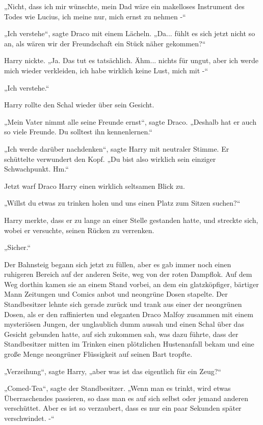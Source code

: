 {„Nicht, dass ich mir wünschte, mein Dad wäre ein makelloses Instrument des Todes wie Lucius, ich meine nur, mich ernst zu nehmen -“

„Ich verstehe“, sagte Draco mit einem Lächeln. „Da... fühlt es sich jetzt nicht so an, als wären wir der Freundschaft ein Stück näher gekommen?“

Harry nickte. „Ja. Das tut es tatsächlich. Ähm... nichts für ungut, aber ich werde mich wieder verkleiden, ich habe wirklich keine Lust, mich mit -“

„Ich verstehe.“

Harry rollte den Schal wieder über sein Gesicht.

„Mein Vater nimmt alle seine Freunde ernst“, sagte Draco. „Deshalb hat er auch so viele Freunde. Du solltest ihn kennenlernen.“

„Ich werde darüber nachdenken“, sagte Harry mit neutraler Stimme. Er schüttelte verwundert den Kopf. „Du bist also wirklich sein einziger Schwachpunkt. Hm.“

Jetzt warf Draco Harry einen wirklich seltsamen Blick zu.

„Willst du etwas zu trinken holen und uns einen Platz zum Sitzen suchen?“

Harry merkte, dass er zu lange an einer Stelle gestanden hatte, und streckte sich, wobei er versuchte, seinen Rücken zu verrenken.

„Sicher.“

Der Bahnsteig begann sich jetzt zu füllen, aber es gab immer noch einen ruhigeren Bereich auf der anderen Seite, weg von der roten Dampflok. Auf dem Weg dorthin kamen sie an einem Stand vorbei, an dem ein glatzköpfiger, bärtiger Mann Zeitungen und Comics anbot und neongrüne Dosen stapelte. Der Standbesitzer lehnte sich gerade zurück und trank aus einer der neongrünen Dosen, als er den raffinierten und eleganten Draco Malfoy zusammen mit einem mysteriösen Jungen, der unglaublich dumm aussah und einen Schal über das Gesicht gebunden hatte, auf sich zukommen sah, was dazu führte, dass der Standbesitzer mitten im Trinken einen plötzlichen Hustenanfall bekam und eine große Menge neongrüner Flüssigkeit auf seinen Bart tropfte.

„Verzeihung“, sagte Harry, „aber was ist das eigentlich für ein Zeug?“

„Comed-Tea“, sagte der Standbesitzer. „Wenn man es trinkt, wird etwas Überraschendes passieren, so dass man es auf sich selbst oder jemand anderen verschüttet. Aber es ist so verzaubert, dass es nur ein paar Sekunden später verschwindet. -“

}
